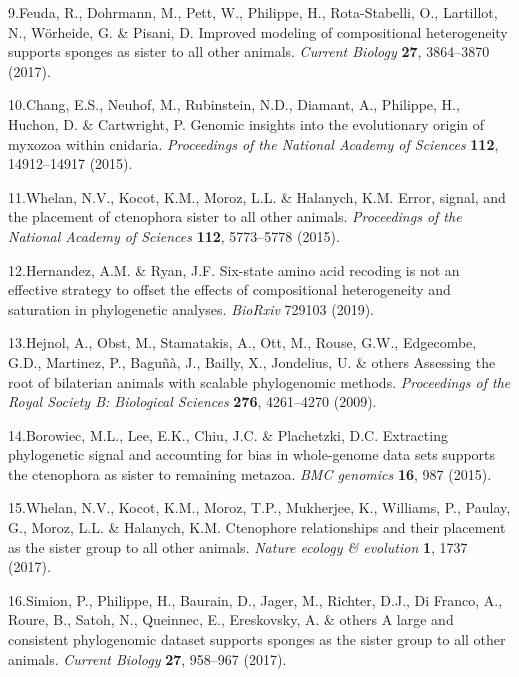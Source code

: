 \documentclass[]{article}
\begin{document}
\leavevmode\hypertarget{ref-feuda2017improved}{}%
9.Feuda, R., Dohrmann, M., Pett, W., Philippe, H., Rota-Stabelli, O.,
Lartillot, N., Wörheide, G. \& Pisani, D. Improved modeling of
compositional heterogeneity supports sponges as sister to all other
animals. \emph{Current Biology} \textbf{27}, 3864--3870 (2017).

\leavevmode\hypertarget{ref-chang2015genomic}{}%
10.Chang, E.S., Neuhof, M., Rubinstein, N.D., Diamant, A., Philippe, H.,
Huchon, D. \& Cartwright, P. Genomic insights into the evolutionary
origin of myxozoa within cnidaria. \emph{Proceedings of the National
Academy of Sciences} \textbf{112}, 14912--14917 (2015).

\leavevmode\hypertarget{ref-whelan2015error}{}%
11.Whelan, N.V., Kocot, K.M., Moroz, L.L. \& Halanych, K.M. Error,
signal, and the placement of ctenophora sister to all other animals.
\emph{Proceedings of the National Academy of Sciences} \textbf{112},
5773--5778 (2015).

\leavevmode\hypertarget{ref-hernandez2019six}{}%
12.Hernandez, A.M. \& Ryan, J.F. Six-state amino acid recoding is not an
effective strategy to offset the effects of compositional heterogeneity
and saturation in phylogenetic analyses. \emph{BioRxiv} 729103 (2019).

\leavevmode\hypertarget{ref-hejnol2009assessing}{}%
13.Hejnol, A., Obst, M., Stamatakis, A., Ott, M., Rouse, G.W.,
Edgecombe, G.D., Martinez, P., Baguñà, J., Bailly, X., Jondelius, U. \&
others Assessing the root of bilaterian animals with scalable
phylogenomic methods. \emph{Proceedings of the Royal Society B:
Biological Sciences} \textbf{276}, 4261--4270 (2009).

\leavevmode\hypertarget{ref-borowiec2015extracting}{}%
14.Borowiec, M.L., Lee, E.K., Chiu, J.C. \& Plachetzki, D.C. Extracting
phylogenetic signal and accounting for bias in whole-genome data sets
supports the ctenophora as sister to remaining metazoa. \emph{BMC
genomics} \textbf{16}, 987 (2015).

\leavevmode\hypertarget{ref-whelan2017ctenophore}{}%
15.Whelan, N.V., Kocot, K.M., Moroz, T.P., Mukherjee, K., Williams, P.,
Paulay, G., Moroz, L.L. \& Halanych, K.M. Ctenophore relationships and
their placement as the sister group to all other animals. \emph{Nature
ecology \& evolution} \textbf{1}, 1737 (2017).

\leavevmode\hypertarget{ref-simion2017large}{}%
16.Simion, P., Philippe, H., Baurain, D., Jager, M., Richter, D.J., Di
Franco, A., Roure, B., Satoh, N., Queinnec, E., Ereskovsky, A. \& others
A large and consistent phylogenomic dataset supports sponges as the
sister group to all other animals. \emph{Current Biology} \textbf{27},
958--967 (2017).
\end{document}
